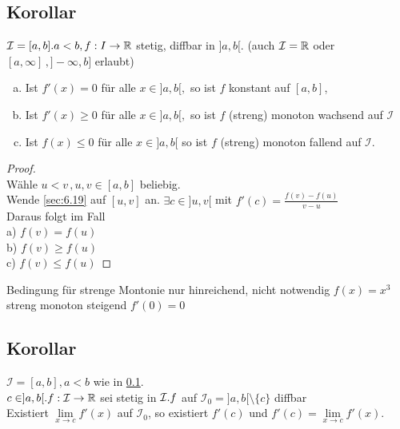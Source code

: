 \subsection{Korollar}\label{sec:6.20}
$\mathcal{I} = [a,b]. a<b, f: I \to \mathbb{R}$ stetig, diffbar in $]a,b[$. (auch $\mathcal{I} = \mathbb{R}$ oder $[a,\infty]\, ,]-\infty,b]$ erlaubt)
\begin{enumerate}[a)]
	\item Ist $f'(x) = 0$ für alle $x \in ]a,b[,$ so ist $f$ konstant auf $[a,b]$,
	\item Ist $f'(x) \ge 0$ für alle $ x\in ]a,b[,$ so ist $f$ (streng) monoton wachsend auf $\mathcal{I}$
	\item Ist $f(x) \le 0$ für alle $x \in ]a,b[$ so ist $f$ (streng) monoton fallend auf $\mathcal{I}$.
\end{enumerate}
\begin{minipage}[c]{0.5\textwidth}
\begin{proof}
	\ \\
	Wähle $u<v\, , u,v \in [a,b]$ beliebig.\\
	Wende \ref{sec:6.19} auf $[u,v]$ an. $\exists c \in ]u,v[$ mit $f'(c) = \frac{f(v)-f(u)}{v-u}$\\
	Daraus folgt im Fall\\
	a) $f(v) = f(u)$\\
	b) $f(v) \ge f(u)$\\
	c) $f(v) \le f(u)$
\end{proof}
\end{minipage}
\begin{minipage}[t]{0.5\textwidth}
Bedingung für strenge Montonie nur hinreichend, nicht notwendig $f(x)= x^3$ streng monoton steigend $f'(0)=0$
\end{minipage}
\subsection{Korollar}\label{sec:6.21}
$\mathcal{I} = [a,b], a<b$ wie in \ref{sec:6.20}.\\
$c \in ]a,b[. f: \mathcal{I} \to \mathbb{R} $ sei stetig in $\mathcal{I}.\\
f$ auf $\mathcal{I}_0 = ]a,b[ \setminus \{c\}$ diffbar\\
Existiert $\lim\limits_{x \to c} f'(x)$ auf $\mathcal{I}_0$, so existiert $f'(c)$ und $f'(c) = \lim\limits_{x \to c} f'(x).$
